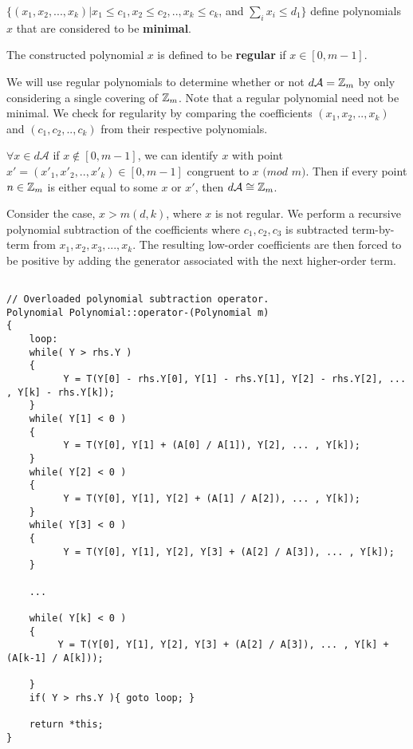 \begin{proposition} 
$ \{ (x_1, x_2, ... , x_k) \vert x_{1} \leq c_1, x_{2} \leq c_2, .. , x_{k} \leq c_k$, and $\sum_{i} x_i \leq d_{1} \}$ define polynomials $x$ that are considered to be \textbf{minimal}.\n
\end{proposition}
\begin{proposition}
The constructed polynomial $x$ is defined to be \textbf{regular} if $x \in [0, m-1]$.
\end{proposition}
We will use regular polynomials to determine whether or not $d \mathcal{A} = \mbox{$\mathbb Z$}_m$ by only considering a single covering of $\mbox{$\mathbb Z$}_m$.\n
\noindent
Note that a regular polynomial need not be minimal.\n
\noindent
We check for regularity by comparing the coefficients $(x_1, x_2, .. , x_{k})$ and $(c_1, c_2, .. , c_k)$ from their respective polynomials.\n

\begin{proposition}
$\forall x \in d \mathcal{A}$ if $x \notin [0, m-1]$, we can identify $x$ with point $x' = (x'_1, x'_2, .. , x'_k) \in [0, m-1]$ congruent to $x$ $(mod$ $m)$.  Then if every point $n \in \mbox{$\mathbb Z$}_m$ is either equal to some $x$ or $x'$, then $d \mathcal{A} \cong \mbox{$\mathbb Z$}_m$.\n
\end{proposition}

\noindent
Consider the case, $x > m(d, k)$, where $x$ is not regular. We perform a recursive polynomial subtraction of the coefficients where $c_1, c_2, c_3$ is subtracted term-by-term from $x_1, x_2, x_3, ... , x_k$. The resulting low-order coefficients are then forced to be positive by adding the generator associated with the next higher-order term.\n

\begin{lstlisting}

// Overloaded polynomial subtraction operator.
Polynomial Polynomial::operator-(Polynomial m)
{
    loop:
    while( Y > rhs.Y )
    {
          Y = T(Y[0] - rhs.Y[0], Y[1] - rhs.Y[1], Y[2] - rhs.Y[2], ... , Y[k] - rhs.Y[k]);
    }
    while( Y[1] < 0 )
    {
          Y = T(Y[0], Y[1] + (A[0] / A[1]), Y[2], ... , Y[k]);
    }
    while( Y[2] < 0 )
    {
          Y = T(Y[0], Y[1], Y[2] + (A[1] / A[2]), ... , Y[k]);
    }
    while( Y[3] < 0 )
    {
          Y = T(Y[0], Y[1], Y[2], Y[3] + (A[2] / A[3]), ... , Y[k]);
    }

    ...

    while( Y[k] < 0 )
    {
         Y = T(Y[0], Y[1], Y[2], Y[3] + (A[2] / A[3]), ... , Y[k] + (A[k-1] / A[k]));

    }
    if( Y > rhs.Y ){ goto loop; } 

    return *this;
}
\end{lstlisting}

